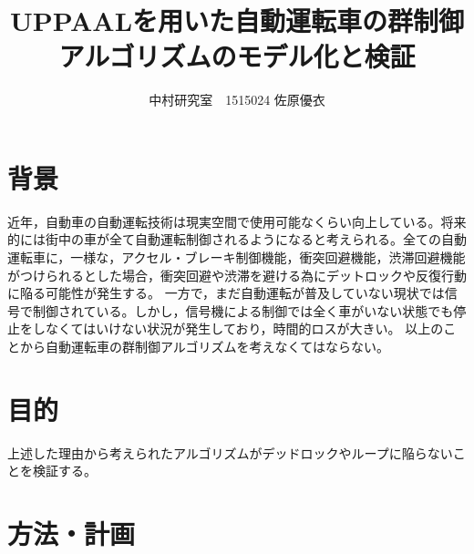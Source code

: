 \documentclass[twocolumn]{jsarticle}
\begin{document}
\title{UPPAALを用いた自動運転車の群制御アルゴリズムのモデル化と検証}
\author{中村研究室　1515024 佐原優衣}
\maketitle

\section{背景}
近年，自動車の自動運転技術は現実空間で使用可能なくらい向上している。将来的には街中の車が全て自動運転制御されるようになると考えられる。全ての自動運転車に，一様な，アクセル・ブレーキ制御機能，衝突回避機能，渋滞回避機能がつけられるとした場合，衝突回避や渋滞を避ける為にデットロックや反復行動に陥る可能性が発生する。
一方で，まだ自動運転が普及していない現状では信号で制御されている。しかし，信号機による制御では全く車がいない状態でも停止をしなくてはいけない状況が発生しており，時間的ロスが大きい。
以上のことから自動運転車の群制御アルゴリズムを考えなくてはならない。

\section{目的}
上述した理由から考えられたアルゴリズムがデッドロックやループに陥らないことを検証する。
\section{方法・計画}
\end{document}
